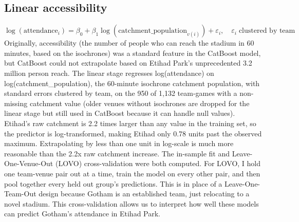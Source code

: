\documentclass[9pt,twoside]{pnas-new}
\begin{document}
\subsection{Linear accessibility}
\begin{equation}
\log(\text{attendance}_{i}) = \beta_0 + \beta_1 \log(\text{catchment\_population}_{v(i)}) + \varepsilon_{i}, \quad \varepsilon_i \; \text{clustered by team}
\label{eq:linear}
\end{equation}
Originally, accessibility (the number of people who can reach the stadium in 60 minutes, based on the isochrones) was a standard feature in the CatBoost model, but CatBoost could not extrapolate based on Etihad Park's unprecedented 3.2 million person reach. The linear stage regresses log(attendance) on log(catchment\_population), the 60-minute isochrone catchment population, with standard errors clustered by team, on the 950 of 1,132 team-games with a non-missing catchment value (older venues without isochrones are dropped for the linear stage but still used in CatBoost because it can handle null values). Etihad's raw catchment is 2.2 times larger than any value in the training set, so the predictor is log-transformed, making Etihad only 0.78 units past the observed maximum. Extrapolating by less than one unit in log-scale is much more reasonable than the 2.2x raw catchment increase. The in-sample fit and Leave-One-Venue-Out (LOVO) cross-validation were both computed. For LOVO, I hold one team-venue pair out at a time, train the model on every other pair, and then pool together every held out group's predictions. This is in place of a Leave-One-Team-Out design because Gotham is an established team, just relocating to a novel stadium. This cross-validation allows us to interpret how well these models can predict Gotham's attendance in Etihad Park.
\end{document}
